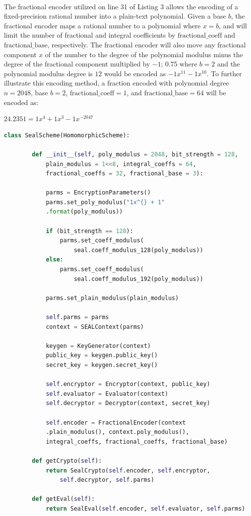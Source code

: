 \documentclass[10pt, a4paper]{article}
\begin{document}
    \paragraph{} The fractional encoder utilized on line 31 of Listing 3 allows the encoding of a fixed-precision rational number into a plain-text polynomial. Given a base $b$, the fractional encoder maps a rational number to a polynomial where $x = b$, and will limit the number of fractional and integral coefficients by $\mathrm{fractional\_coeff}$ and $\mathrm{fractional\_base}$, respectively. The fractional encoder will also move any fractional component $x$ of the number to the degree of the polynomial modulus minus the degree of the fractional component multiplied by $-1$; 0.75 where $b=2$ and the polynomial modulus degree is $12$ would be encoded as $-1x^{11} - 1x^{10}$. To further illustrate this encoding method, a fraction encoded with polynomial degree $n=2048$, base $b=2$, $\mathrm{fractional\_coeff} = 1$, and $\mathrm{fractional\_base} = 64$ will be encoded as:
    
    	 {\centering \Medium \(
        24.2351 = 1x^4 + 1x^3 - 1x^{-2047} 
        
    \)\par}
	
	\begin{lstlisting}[language=Python,caption = SEAL Scheme Initialization]
	class SealScheme(HomomorphicScheme):
	
		def __init__(self, poly_modulus = 2048, bit_strength = 128, 
			plain_modulus = 1<<8, integral_coeffs = 64, 
			fractional_coeffs = 32, fractional_base = 3):
			
			parms = EncryptionParameters()
			parms.set_poly_modulus("1x^{} + 1"
			.format(poly_modulus))
			
			if (bit_strength == 128):
				parms.set_coeff_modulus(
					seal.coeff_modulus_128(poly_modulus))
			else:
				parms.set_coeff_modulus(
					seal.coeff_modulus_192(poly_modulus))
			
			parms.set_plain_modulus(plain_modulus)
			
			self.parms = parms
			context = SEALContext(parms)
			
			keygen = KeyGenerator(context)
			public_key = keygen.public_key()
			secret_key = keygen.secret_key()
			
			self.encryptor = Encryptor(context, public_key)
			self.evaluator = Evaluator(context)
			self.decryptor = Decryptor(context, secret_key)
			
			self.encoder = FractionalEncoder(context
			.plain_modulus(), context.poly_modulus(), 
			integral_coeffs, fractional_coeffs, fractional_base)
		
		def getCrypto(self):
			return SealCrypto(self.encoder, self.encryptor, 
				self.decryptor, self.parms)
		
		def getEval(self):
			return SealEval(self.encoder, self.evaluator, self.parms)
	\end{lstlisting}
	
\end{document}
